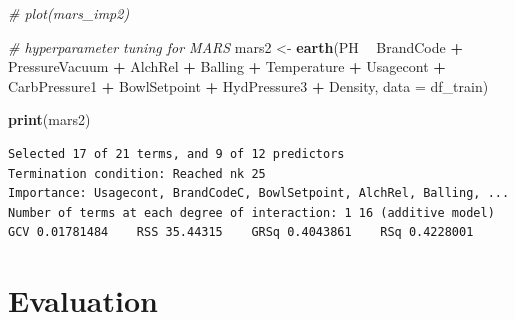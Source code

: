 \documentclass[]{report}
\newenvironment{Shaded}{\begin{snugshade}}{\end{snugshade}}
\newcommand{\CommentTok}[1]{\textcolor[rgb]{0.56,0.35,0.01}{\textit{#1}}}
\newcommand{\DataTypeTok}[1]{\textcolor[rgb]{0.13,0.29,0.53}{#1}}
\newcommand{\KeywordTok}[1]{\textcolor[rgb]{0.13,0.29,0.53}{\textbf{#1}}}
\newcommand{\NormalTok}[1]{#1}
\newcommand{\OperatorTok}[1]{\textcolor[rgb]{0.81,0.36,0.00}{\textbf{#1}}}
\newcommand{\StringTok}[1]{\textcolor[rgb]{0.31,0.60,0.02}{#1}}
\begin{document}
\begin{Shaded}
\begin{Highlighting}[]
\CommentTok{# plot(mars_imp2)}
\end{Highlighting}
\end{Shaded}

\begin{Shaded}
\begin{Highlighting}[]
\CommentTok{# hyperparameter tuning for MARS}
\NormalTok{mars2 <-}\StringTok{ }\KeywordTok{earth}\NormalTok{(PH }\OperatorTok{~}\StringTok{ }\NormalTok{BrandCode }\OperatorTok{+}\StringTok{ }\NormalTok{PressureVacuum }\OperatorTok{+}\StringTok{ }\NormalTok{AlchRel }\OperatorTok{+}\StringTok{ }\NormalTok{Balling }\OperatorTok{+}\StringTok{ }
\StringTok{    }\NormalTok{Temperature }\OperatorTok{+}\StringTok{ }\NormalTok{Usagecont }\OperatorTok{+}\StringTok{ }\NormalTok{CarbPressure1 }\OperatorTok{+}\StringTok{ }\NormalTok{BowlSetpoint }\OperatorTok{+}\StringTok{ }
\StringTok{    }\NormalTok{HydPressure3 }\OperatorTok{+}\StringTok{ }\NormalTok{Density, }\DataTypeTok{data =}\NormalTok{ df_train)}

\KeywordTok{print}\NormalTok{(mars2)}
\end{Highlighting}
\end{Shaded}

\begin{verbatim}
Selected 17 of 21 terms, and 9 of 12 predictors
Termination condition: Reached nk 25
Importance: Usagecont, BrandCodeC, BowlSetpoint, AlchRel, Balling, ...
Number of terms at each degree of interaction: 1 16 (additive model)
GCV 0.01781484    RSS 35.44315    GRSq 0.4043861    RSq 0.4228001
\end{verbatim}

\hypertarget{evaluation}{%
\section{Evaluation}\label{evaluation}}
\end{document}
